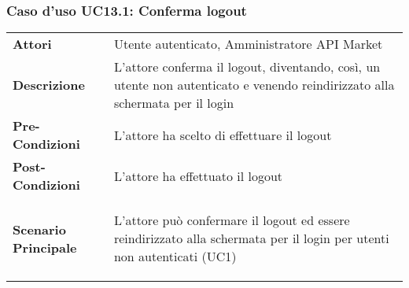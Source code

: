 \newpage
\subsubsection{Caso d'uso UC13.1: Conferma logout}
\label{UC13.1}

\renewcommand*{\arraystretch}{1.6}
\begin{longtable}{ l | p{11cm}}
	\hline
	\rowcolor{Gray}
	\multicolumn{2}{c}{UC13.1 - Conferma logout} \\
	\hline
	\textbf{Attori} &Utente autenticato, Amministratore API Market \\
	\textbf{Descrizione} &L'attore conferma il logout, diventando, così, un utente non autenticato e venendo reindirizzato alla schermata per il login\\
	\textbf{Pre-Condizioni} &L'attore ha scelto di effettuare il logout\\
	\textbf{Post-Condizioni}&L'attore ha effettuato il logout\\
	\textbf{Scenario Principale} & \begin{enumerate*}[label=(\arabic*.),itemjoin={\newline}]
		\item L'attore può confermare il logout ed essere reindirizzato alla schermata per il login per utenti non autenticati (UC1)
	\end{enumerate*}\\
\end{longtable}
